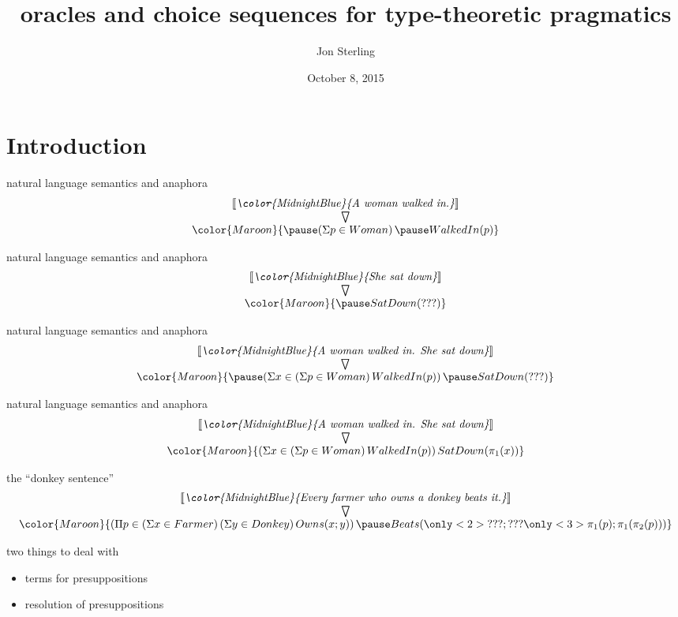 \documentclass[10pt]{beamer}
\title{oracles and choice sequences for type-theoretic pragmatics}
\date{October 8, 2015}
\institute{joint work with Darryl McAdams}
\author{Jon Sterling}
\def\InputModeColorName{MidnightBlue}
\def\OutputModeColorName{Maroon}
\newcommand\IMode[1]{{\color{\InputModeColorName}{#1}}}
\newcommand\OMode[1]{{\color{\OutputModeColorName}{#1}}}
\newcommand\SemBrackets[1]{\left\llbracket #1\right\rrbracket}
\newcommand\Meaning[1]{\SemBrackets{\textit{#1}}}
\newcommand\VertSem[2]{%
  \begin{array}{c}%
    \Meaning{\IMode{#1}}\\%
    \bigtriangledown\\%
    \OMode{#2}%
  \end{array}%
}
\newcommand\TyFun[3]{(\Pi #2\in #1)\, #3}
\newcommand\TyProd[3]{(\Sigma #2\in #1)\, #3}
\newcommand\Proj[1]{\pi_{#1}}
\begin{document}
\maketitle

\section{Introduction}

\begin{frame}{natural language semantics and anaphora}
  \pause
  \[
    \VertSem{A woman walked in.}{
      \pause
      \TyProd{Woman}{p}{\pause WalkedIn(p)}
    }
  \]
\end{frame}

\begin{frame}{natural language semantics and anaphora}
  \[
    \VertSem{She sat down}{
      \pause
      SatDown(???)
    }
  \]
\end{frame}

\begin{frame}{natural language semantics and anaphora}
  \[
    \VertSem{A woman walked in. She sat down}{
      \pause
      \TyProd{\TyProd{Woman}{p}{WalkedIn(p)}}{x}{
        \pause
        SatDown(???)
      }
    }
  \]
\end{frame}

\begin{frame}{natural language semantics and anaphora}
  \[
    \VertSem{A woman walked in. She sat down}{
      \TyProd{\TyProd{Woman}{p}{WalkedIn(p)}}{x}{
        SatDown(\Proj{1}(x))
      }
    }
  \]
\end{frame}

\begin{frame}{the ``donkey sentence''}
  \[
    \VertSem{Every farmer who owns a donkey beats it.}{
      \TyFun{
        \TyProd{Farmer}{x}{
          \TyProd{Donkey}{y}{
            Owns(x;y)
          }
        }
      }{p}{
        \pause
        Beats(\only<2>{???;???}\only<3>{\Proj{1}(p);\Proj{1}(\Proj{2}(p))})
      }
    }
  \]
\end{frame}

\begin{frame}{two things to deal with}
  \pause
  \begin{itemize}[<+->]
    \item \alert<4-5>{terms for presuppositions}
    \item resolution of presuppositions
  \end{itemize}
\end{frame}
\end{document}
